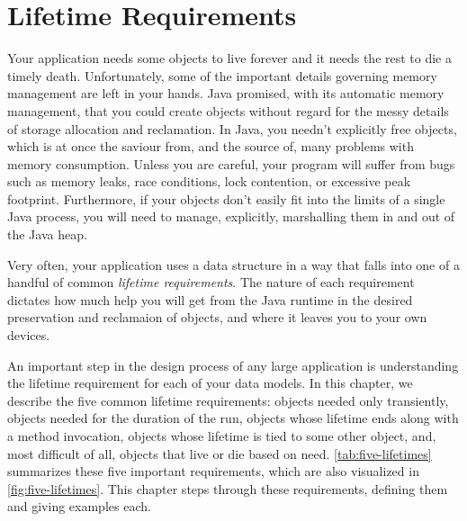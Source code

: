 \chapter{Lifetime Requirements}

Your application needs some objects to live forever and it needs the rest to die
a timely death. Unfortunately, some of the important details governing memory
management are left in your hands. Java promised, with its automatic memory
management, that you could create objects without regard for the messy details of
storage allocation and reclamation. In Java, you needn't explicitly free objects,
which is at once the saviour from, and the source of, many problems with memory
consumption. Unless you are careful, your program will suffer from bugs such as
memory leaks, race conditions, lock contention, or excessive
peak footprint. Furthermore, if your objects don't easily fit into the limits of
a single Java process, you will need to manage, explicitly, marshalling them in
and out of the Java heap.

Very often, your application uses a data structure in a way that falls into one
of a handful of common \emph{lifetime requirements}. The
nature of each requirement dictates how much help you will get from the Java runtime
in the desired preservation and reclamaion of objects, and where it leaves you to
your own devices. 

An important step in the design process of any large application is understanding
the lifetime requirement for each of your data models. In this chapter, we
describe the five common lifetime requirements: objects needed only transiently,
objects needed for the duration of the run, objects whose lifetime ends along
with a method invocation, objects whose lifetime is tied to some other object,
and, most difficult of all, objects that live or die based on need.
\autoref{tab:five-lifetimes} summarizes these five important requirements,
which are also visualized in \autoref{fig:five-lifetimes}. This chapter steps
 through these requirements, defining them and giving examples each.

